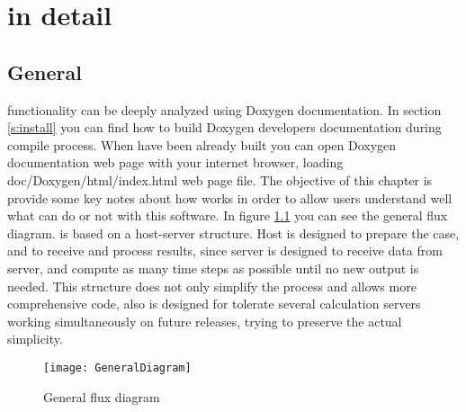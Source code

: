 \chapter{\NAME in detail}
\label{s:aquagpusph}
%
\section{General}
\label{ss:aquagpusph:general}
%
\NAME functionality can be deeply analyzed using Doxygen documentation. In section \ref{s:install}
you can find how to build Doxygen developers documentation during \NAME compile process. When \NAME
have been already built you can open Doxygen documentation web page with your internet browser,
loading doc/Doxygen/html/index.html web page file.\rc
%
The objective of this chapter is provide some key notes about how \NAME works in order to allow users
understand well what can do or not with this software.\rc
%
In figure \ref{fig:aquagpusph:generalDiagram} you can see the general flux diagram. \NAME is based on a
host-server structure. Host is designed to prepare the case, and to receive and process results, since
server is designed to receive data from server, and compute as many time steps as possible until no new
output is needed.\rc
%
This structure does not only simplify the process and allows more comprehensive code, also is designed
for tolerate several calculation servers working simultaneously on future releases, trying to preserve
the actual simplicity.
%
\begin{figure}[ht!]
  \centering
  \texttt{[image: GeneralDiagram]}
  \caption{General \NAME flux diagram}
  \label{fig:aquagpusph:generalDiagram}
\end{figure}
%
